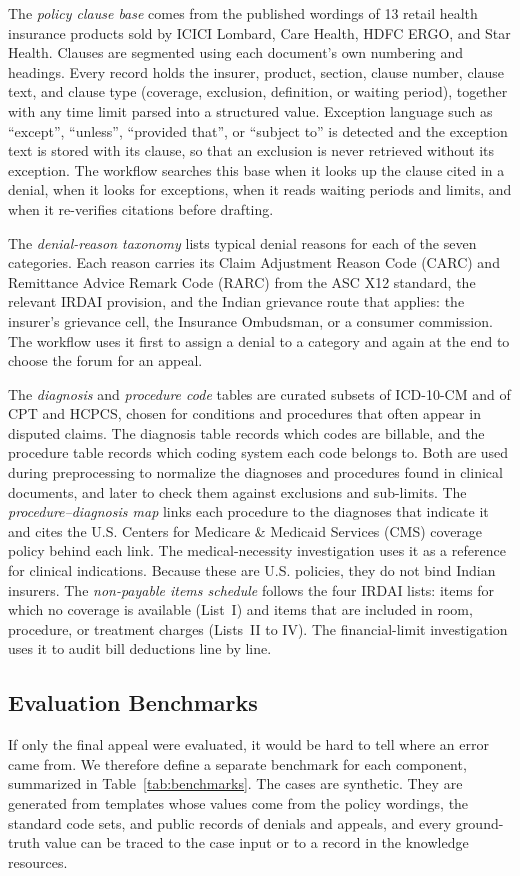 \documentclass[conference]{IEEEtran}
\begin{document}
The \emph{policy clause base} comes from the published wordings of 13 retail health insurance products sold by ICICI Lombard, Care Health, HDFC ERGO, and Star Health. Clauses are segmented using each document's own numbering and headings. Every record holds the insurer, product, section, clause number, clause text, and clause type (coverage, exclusion, definition, or waiting period), together with any time limit parsed into a structured value. Exception language such as ``except'', ``unless'', ``provided that'', or ``subject to'' is detected and the exception text is stored with its clause, so that an exclusion is never retrieved without its exception. The workflow searches this base when it looks up the clause cited in a denial, when it looks for exceptions, when it reads waiting periods and limits, and when it re-verifies citations before drafting.

The \emph{denial-reason taxonomy} lists typical denial reasons for each of the seven categories. Each reason carries its Claim Adjustment Reason Code (CARC) and Remittance Advice Remark Code (RARC) from the ASC X12 standard, the relevant IRDAI provision, and the Indian grievance route that applies: the insurer's grievance cell, the Insurance Ombudsman, or a consumer commission. The workflow uses it first to assign a denial to a category and again at the end to choose the forum for an appeal.

The \emph{diagnosis} and \emph{procedure code} tables are curated subsets of ICD-10-CM and of CPT and HCPCS, chosen for conditions and procedures that often appear in disputed claims. The diagnosis table records which codes are billable, and the procedure table records which coding system each code belongs to. Both are used during preprocessing to normalize the diagnoses and procedures found in clinical documents, and later to check them against exclusions and sub-limits. The \emph{procedure--diagnosis map} links each procedure to the diagnoses that indicate it and cites the U.S. Centers for Medicare \& Medicaid Services (CMS) coverage policy behind each link. The medical-necessity investigation uses it as a reference for clinical indications. Because these are U.S. policies, they do not bind Indian insurers. The \emph{non-payable items schedule} follows the four IRDAI lists: items for which no coverage is available (List~I) and items that are included in room, procedure, or treatment charges (Lists~II to IV). The financial-limit investigation uses it to audit bill deductions line by line.

\subsection{Evaluation Benchmarks}
If only the final appeal were evaluated, it would be hard to tell where an error came from. We therefore define a separate benchmark for each component, summarized in Table~\ref{tab:benchmarks}. The cases are synthetic. They are generated from templates whose values come from the policy wordings, the standard code sets, and public records of denials and appeals, and every ground-truth value can be traced to the case input or to a record in the knowledge resources.
\end{document}
